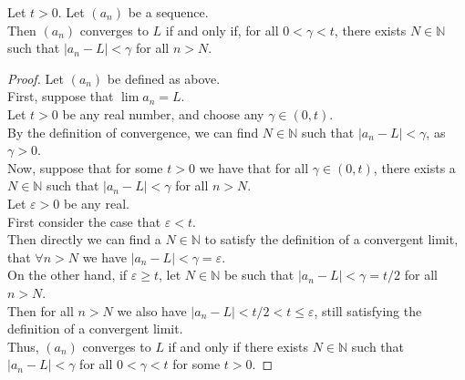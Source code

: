 \documentclass{article}
\newenvironment{theorem}[1]{\renewcommand\theinnercustomthm{#1}\innercustomthm}
  {\endinnercustomthm}
\begin{document}
\newpage{}
\begin{theorem}{4}
    Let $t>0$. Let $(a_n)$ be a sequence. \\
    Then $(a_n)$ converges to $L$ if and only if, for all $0 < \gamma < t$, there exists $N\in \mathbb N$ such that $|a_n - L| < \gamma$ for all $n > N$. 
\end{theorem}
\begin{proof}
    Let $(a_n)$ be defined as above. \\
    
    First, suppose that $\lim a_n = L$. \\
    Let $t> 0$ be any real number, and choose any $\gamma \in (0, t)$. \\
    By the definition of convergence, we can find $N \in \mathbb N$ such that $|a_n - L | < \gamma$, as $\gamma > 0$. \\

    Now, suppose that for some $t > 0$ we have that for all $\gamma \in (0, t)$, there exists a $N \in \mathbb N$ such that $|a_n - L | < \gamma$ for all $n > N$. \\
    Let $\varepsilon > 0$ be any real. \\
    First consider the case that $\varepsilon < t$. \\
    Then directly we can find a $N \in \mathbb N$ to satisfy the definition of a convergent limit, that $\forall n > N$ we have $|a_n - L | < \gamma = \varepsilon$. \\
    On the other hand, if $\varepsilon \ge t$, let $N \in \mathbb N$ be such that $|a_n - L | < \gamma = t/2$ for all $n > N$. \\
    Then for all $n > N$ we also have $|a_n - L | < t/2 < t \le \varepsilon$, still satisfying the definition of a convergent limit.\\

    Thus, $(a_n)$ converges to $L$ if and only if there exists $N \in \mathbb N$ such that $|a_n - L| < \gamma$ for all $0 < \gamma < t$ for some $t > 0$.
\end{proof}
\end{document}
